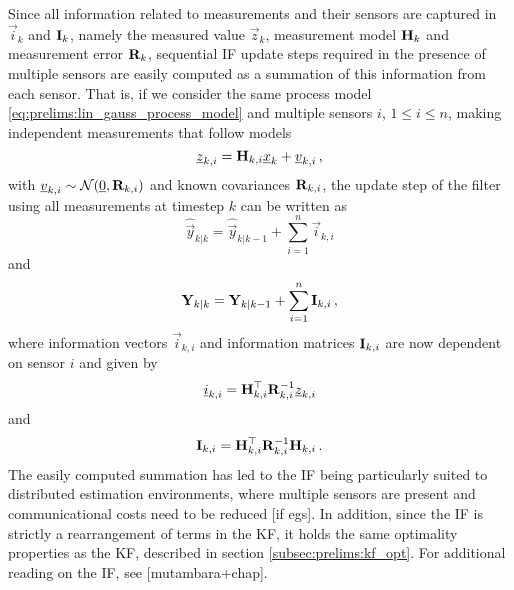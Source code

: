Since all information related to measurements and their sensors are captured in $\vec{i}_k$ and ${{\mathbf{I}}}_k$, namely the measured value $\vec{z}_k$, measurement model ${{\mathbf{H}}}_k$ and measurement error ${{\mathbf{R}}}_k$, sequential IF update steps required in the presence of multiple sensors are easily computed as a summation of this information from each sensor. That is, if we consider the same process model \eqref{eq:prelims:lin_gauss_process_model} and multiple sensors $i$, $1\leq i\leq n$, making independent measurements that follow models
\begin{equation}
    {\underline{z}}_{k,i} = {{\mathbf{H}}}_{k,i} {\underline{x}}_k + {\underline{v}}_{k,i}\,,
\end{equation}
with ${\underline{v}}_{k, i}\sim\mathcal{N}({\underline{0}},{{\mathbf{R}}}_{k, i})$ and known covariances ${{\mathbf{R}}}_{k, i}$, the update step of the filter using all measurements at timestep $k$ can be written as
\begin{equation}\label{eq:prelims:if_info_vec_update}
    \hat{\vec{y}}_{k|k} = \hat{\vec{y}}_{k|k-1} + \sum_{i=1}^n\vec{i}_{k,i}
\end{equation}
and
\begin{equation}\label{eq:prelims:if_info_mat_update}
    {\ensuremath{{\mathbf{Y}}}}_{k|k} = {{\mathbf{Y}}}_{k|k-1} + \sum_{i=1}^n{{\mathbf{I}}}_{k,i}\,,
\end{equation}
where information vectors $\vec{i}_{k,i}$ and information matrices ${{\mathbf{I}}}_{k,i}$ are now dependent on sensor $i$ and given by
\begin{equation}\label{eq:prelims:if_measurement_vec_defn}
    {\underline{i}}_{k,i} = {{\mathbf{H}}}_{k,i}^\top{\ensuremath{{\mathbf{R}}}}_{k,i}^{-1}{\underline{z}}_{k,i}
\end{equation}
and
\begin{equation}\label{eq:prelims:if_measurement_mat_defn}
    {\ensuremath{{\mathbf{I}}}}_{k,i} = {{\mathbf{H}}}_{k,i}^\top{\ensuremath{{\mathbf{R}}}}_{k,i}^{-1}{{\mathbf{H}}}_{k,i}\,.
\end{equation}
The easily computed summation has led to the IF being particularly suited to distributed estimation environments, where multiple sensors are present and communicational costs need to be reduced [if egs]. In addition, since the IF is strictly a rearrangement of terms in the KF, it holds the same optimality properties as the KF, described in section \ref{subsec:prelims:kf_opt}. For additional reading on the IF, see [mutambara+chap].

% 
% 

